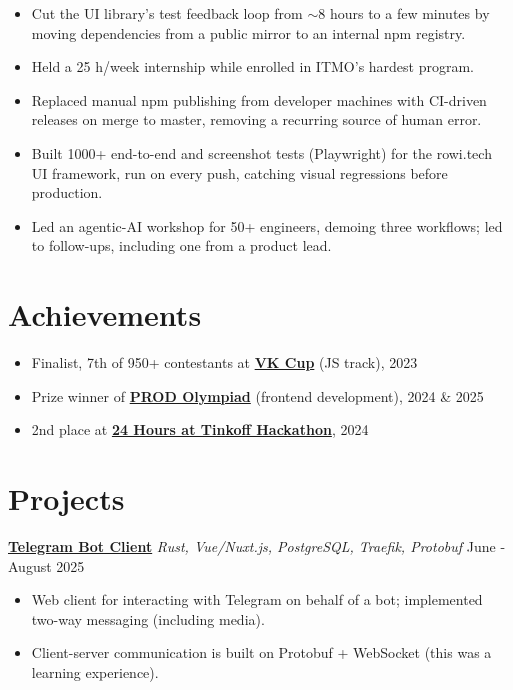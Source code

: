 \documentclass[11pt,a4paper]{article}
\begin{document}
\begin{itemize}[leftmargin=*,itemsep=1pt,topsep=2pt,parsep=0pt]
	\item Cut the UI library's test feedback loop from $\sim$8 hours to a few minutes by moving dependencies from a public mirror to an internal npm registry.
	\item Held a 25 h/week internship while enrolled in ITMO's hardest program.
	\item Replaced manual npm publishing from developer machines with CI-driven releases on merge to master, removing a recurring source of human error.
	\item Built 1000+ end-to-end and screenshot tests (Playwright) for the rowi.tech UI framework, run on every push, catching visual regressions before production.
	\item Led an agentic-AI workshop for 50+ engineers, demoing three workflows; led to follow-ups, including one from a product lead.
\end{itemize}

\section*{Achievements}
\begin{itemize}[leftmargin=*,itemsep=1pt,topsep=2pt,parsep=0pt]
	\item Finalist, 7th of 950+ contestants at \href{https://vk.com/wall-41208167_2648}{\textbf{VK Cup}} (JS track), 2023
	\item Prize winner of \href{https://prodcontest.com/eng}{\textbf{PROD Olympiad}} (frontend development), 2024 \& 2025
	\item 2nd place at \href{https://education.tbank.ru/activities/tinkoff_projects/hackathon-24h/}{\textbf{24 Hours at Tinkoff Hackathon}}, 2024
\end{itemize}

\section*{Projects}

\noindent\href{https://github.com/paranoidPhantom/eclipse}{\textbf{Telegram Bot Client}} \textit{Rust, Vue/Nuxt.js, PostgreSQL, Traefik, Protobuf} \hfill June - August 2025
\begin{itemize}[leftmargin=*,itemsep=1pt,topsep=2pt,parsep=0pt]
	\item Web client for interacting with Telegram on behalf of a bot; implemented two-way messaging (including media).
	\item Client-server communication is built on Protobuf + WebSocket (this was a learning experience).
\end{itemize}
\end{document}
